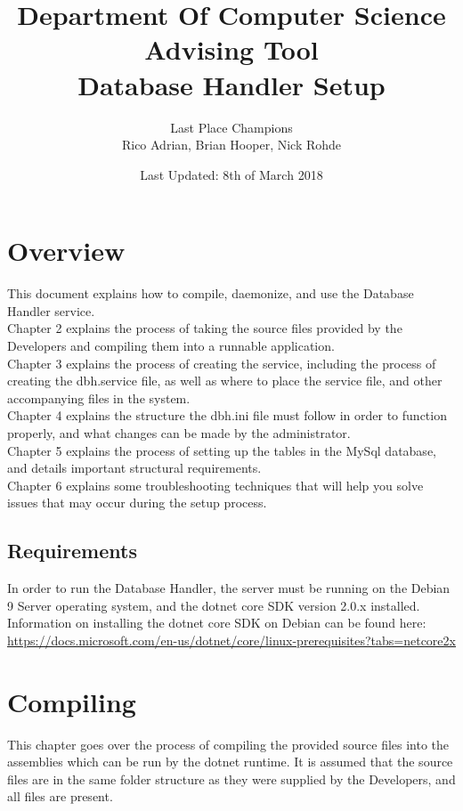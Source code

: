 \documentclass[letterpaper]{article}
\title{Department Of Computer Science Advising Tool \\ Database Handler Setup}
\author{Last Place Champions \\ Rico Adrian, Brian Hooper, Nick Rohde}
\date{Last Updated: 8th of March 2018}
\begin{document}
	\maketitle
	\pagebreak
	\tableofcontents
	\pagebreak
	
	\section{Overview}
	This document explains how to compile, daemonize, and use the Database Handler service. \\ Chapter 2 explains the process of taking the source files provided by the Developers and compiling them into a runnable application. \\ Chapter 3 explains the process of creating the service, including the process of creating the dbh.service file, as well as where to place the service file, and other accompanying files in the system.\\ Chapter 4 explains the structure the dbh.ini file must follow in order to function properly, and what changes can be made by the administrator. \\ Chapter 5 explains the process of setting up the tables in the MySql database, and details important structural requirements. \\ Chapter 6 explains some troubleshooting techniques that will help you solve issues that may occur during the setup process.
	
	\subsection{Requirements}
	In order to run the Database Handler, the server must be running on the Debian 9 Server operating system, and the dotnet core SDK version 2.0.x installed. Information on installing the dotnet core SDK on Debian can be found here: \url{https://docs.microsoft.com/en-us/dotnet/core/linux-prerequisites?tabs=netcore2x}
	 
	\section{Compiling}
	This chapter goes over the process of compiling the provided source files into the assemblies which can be run by the dotnet runtime. It is assumed that the source files are in the same folder structure as they were supplied by the Developers, and all files are present.
\end{document}
